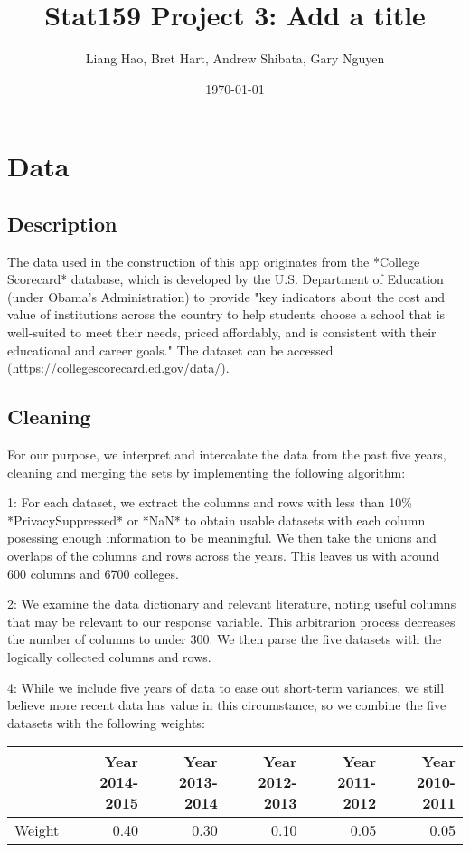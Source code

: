 \documentclass{article}\usepackage[]{graphicx}\usepackage[]{color}
\title{Stat159 Project 3: Add a title}
\author{Liang Hao, Bret Hart, Andrew Shibata, Gary Nguyen}
\date{\today}
\begin{document}

\maketitle
\section{Data}



\subsection{Description}

The data used in the construction of this app originates from the *College Scorecard* database, which is developed by the U.S. Department of Education (under Obama's Administration) to provide "key indicators about the cost and value of institutions across the country to help students choose a school that is well-suited to meet their needs, priced affordably, and is consistent with their educational and career goals." The dataset can be accessed \href{here}(https://collegescorecard.ed.gov/data/).

\subsection{Cleaning}
For our purpose, we interpret and intercalate the data from the past five years, cleaning and merging the sets by implementing the following algorithm:

1: For each dataset, we extract the columns and rows with less than 10\% *PrivacySuppressed* or *NaN* to obtain usable datasets with each column posessing enough information to be meaningful. We then take the unions and overlaps of the columns and rows across the years. This leaves us with around 600 columns and 6700 colleges.

2: We examine the data dictionary and relevant literature, noting useful columns that may be relevant to our response variable. This arbitrarion process decreases the number of columns to under 300. We then parse the five datasets with the logically collected columns and rows.

4: While we include five years of data to ease out short-term variances, we still believe more recent data has value in this circumstance, so we combine the five datasets with the following weights:

\begin{table}[ht]
\centering
\begin{tabular}{rrrrrr}
  \hline
 & Year 2014-2015 & Year 2013-2014 & Year 2012-2013 & Year 2011-2012 & Year 2010-2011 \\ 
  \hline
Weight & 0.40 & 0.30 & 0.10 & 0.05 & 0.05 \\ 
   \hline
\end{tabular}
\end{table}
\end{document}
